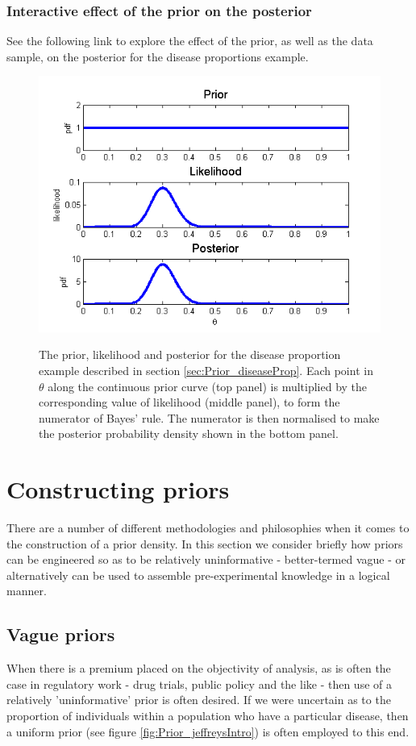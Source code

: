 \documentclass[11pt,fullpage]{book}
\begin{document}
\subsubsection{Interactive effect of the prior on the posterior}
See the following link to explore the effect of the prior, as well as the data sample, on the posterior for the disease proportions example.


\begin{figure}
\centering
\scalebox{0.75} 
{\includegraphics{Prior_disease.png}}
\caption{The prior, likelihood and posterior for the disease proportion example described in section \ref{sec:Prior_diseaseProp}. Each point in $\theta$ along the continuous prior curve (top panel) is multiplied by the corresponding value of likelihood (middle panel), to form the numerator of Bayes' rule. The numerator is then normalised to make the posterior probability density shown in the bottom panel.}\label{fig:Prior_disease}
\end{figure}

\section{Constructing priors}
There are a number of different methodologies and philosophies when it comes to the construction of a prior density. In this section we consider briefly how priors can be engineered so as to be relatively uninformative - better-termed vague - or alternatively can be used to assemble pre-experimental knowledge in a logical manner.

\subsection{Vague priors}\label{sec:Prior_vague}
When there is a premium placed on the objectivity of analysis, as is often the case in regulatory work - drug trials, public policy and the like - then use of a relatively 'uninformative' prior is often desired. If we were uncertain as to the proportion of individuals within a population who have a particular disease, then a uniform prior (see figure \ref{fig:Prior_jeffreysIntro}) is often employed to this end. 
\end{document}

